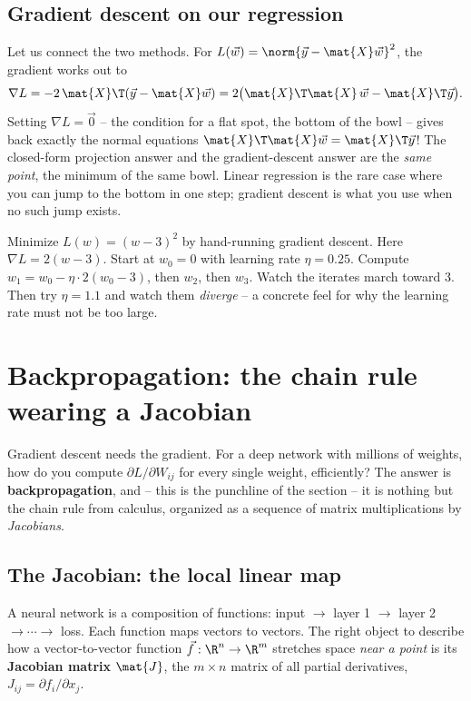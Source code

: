 \subsection{Gradient descent on our regression}

Let us connect the two methods. For $L(\vec{w})=\norm{\vec{y}-\mat{X}\vec{w}}^2$, the
gradient works out to
\[
\nabla L = -2\,\mat{X}\T(\vec{y}-\mat{X}\vec{w}) = 2\big(\mat{X}\T\mat{X}\,\vec{w}-\mat{X}\T\vec{y}\big).
\]
Setting $\nabla L = \vec{0}$ -- the condition for a flat spot, the bottom of the bowl --
gives back exactly the normal equations $\mat{X}\T\mat{X}\vec{w}=\mat{X}\T\vec{y}$! The
closed-form projection answer and the gradient-descent answer are the \emph{same point},
the minimum of the same bowl. Linear regression is the rare case where you can jump to the
bottom in one step; gradient descent is what you use when no such jump exists.

\begin{labbox}
Minimize $L(w)=(w-3)^2$ by hand-running gradient descent. Here $\nabla L = 2(w-3)$. Start
at $w_0=0$ with learning rate $\eta=0.25$. Compute $w_1=w_0-\eta\cdot 2(w_0-3)$, then
$w_2$, then $w_3$. Watch the iterates march toward $3$. Then try $\eta=1.1$ and watch them
\emph{diverge} -- a concrete feel for why the learning rate must not be too large.
\end{labbox}

\section{Backpropagation: the chain rule wearing a Jacobian}
\label{ch34:backprop}

Gradient descent needs the gradient. For a deep network with millions of weights, how do
you compute $\partial L / \partial W_{ij}$ for every single weight, efficiently? The
answer is \textbf{backpropagation}, and -- this is the punchline of the section -- it is
nothing but the chain rule from calculus, organized as a sequence of matrix
multiplications by \emph{Jacobians}.

\subsection{The Jacobian: the local linear map}

A neural network is a composition of functions: input $\to$ layer 1 $\to$ layer 2 $\to
\cdots \to$ loss. Each function maps vectors to vectors. The right object to describe how a
vector-to-vector function $\vec{f}:\R^{n}\to\R^{m}$ stretches space \emph{near a point} is
its \textbf{Jacobian matrix} $\mat{J}$, the $m\times n$ matrix of all partial derivatives,
$J_{ij}=\partial f_i/\partial x_j$.

